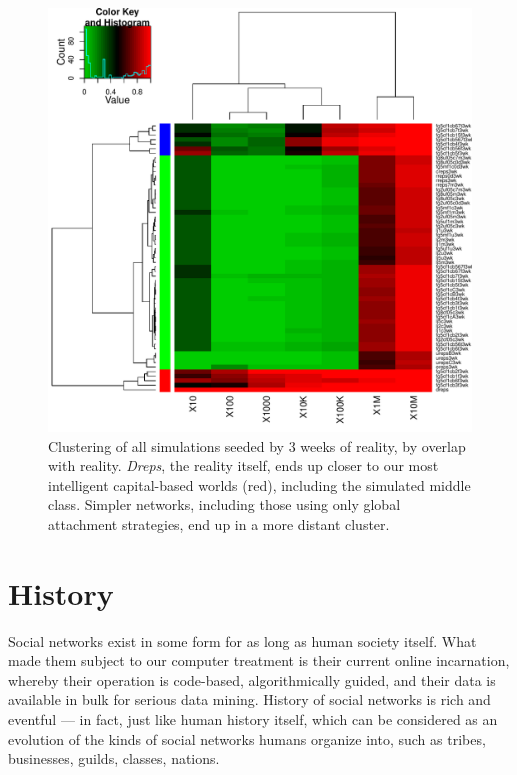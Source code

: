 \documentclass[10pt,oneside]{memoir}
\begin{document}
\begin{Spacing}{2}
\begin{figure}
\begin{center}
    \includegraphics{figures/heatmap-overx-dreps-medians-3wk}
    \caption{Clustering of all simulations seeded by 3 weeks of reality, by overlap with reality.  \emph{Dreps}, the reality itself, ends up closer to our most intelligent capital-based worlds (red), including the simulated middle class.  Simpler networks, including those using only global attachment strategies, end up in a more distant cluster.}
    \label{figure:heatmap-srates-medians-3wk}
\end{center}
\end{figure}
\pagebreak \section{History}
\label{history}

Social networks exist in some form for as long as human society itself.  What made them subject to our computer treatment is their current online incarnation, whereby their operation is code-based, algorithmically guided, and their data is available in bulk for serious data mining.
History of social networks is rich and eventful --- in fact, just like human history itself, which can be considered as an evolution of the kinds of social networks humans organize into, such as tribes, businesses, guilds, classes, nations.



\end{Spacing}
\end{document}
